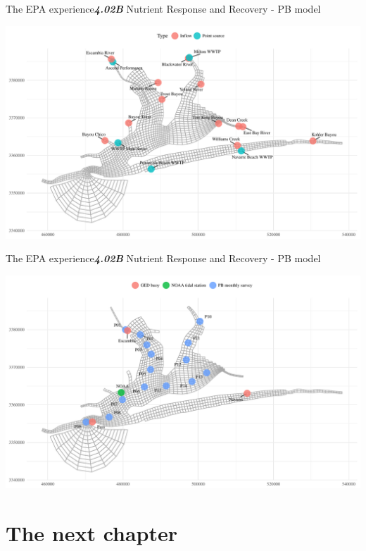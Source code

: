 \documentclass[serif]{beamer}\usepackage[]{graphicx}\usepackage[]{color}
\makeatletter
\def\maxwidth{ %
  \ifdim\Gin@nat@width>\linewidth
    \linewidth
  \else
    \Gin@nat@width
  \fi
}
\newcommand{\emtxt}[1]{\textbf{\textit{#1}}}
\makeatother
\begin{document}
\begin{frame}{The EPA experience}{\emtxt{4.02B} Nutrient Response and Recovery - PB model}


{\centering \includegraphics[width=\maxwidth]{fig/unnamed-chunk-5-1} 

}



\end{frame}


\begin{frame}{The EPA experience}{\emtxt{4.02B} Nutrient Response and Recovery - PB model}


{\centering \includegraphics[width=\maxwidth]{fig/unnamed-chunk-6-1} 

}



\end{frame}

\section{The next chapter}
\end{document}
